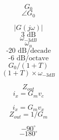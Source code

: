 \documentclass[letterpaper 12pt]{book}
\begin{document}
\[ G_0 \]
\[ \angle G_0 \]

\[ |G(j\omega)| \]
\[ \text{3 dB} \]
\[ \omega_{-3 dB} \]
\[ \omega_u \]
\[ \text{-20 dB/decade} \]
\[ \text{-6 dB/octave} \]
\[ G_0/(1+T) \]
\[ (1+T) \times \omega_{-3 dB} \]


\[ Z_{out} \]
\[ i_x = G_m v_c \]

\[ i_x = G_m v_x \]
\[ Z_{out} = 1/G_m \]

\[ -90^\circ \]
\[ -180^\circ \]
\end{document}
